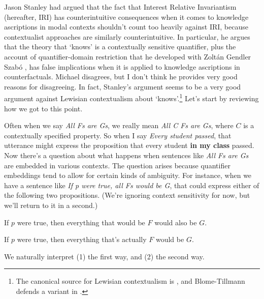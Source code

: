 Jason Stanley had argued that the fact that Interest Relative Invariantism (hereafter, IRI) has counterintuitive consequences when it comes to knowledge ascriptions in modal contexts shouldn't count too heavily against IRI, because contextualist approaches are similarly counterintuitive. In particular, he argues that the theory that `knows' is a contextually sensitive quantifier, plus the account of quantifier-domain restriction that he developed with Zolt\'{a}n Gendler Szab\'{o} \citep{Stanley2000-STAOQD}, has false implications when it is applied to knowledge ascriptions in counterfactuals. Michael \cite{MBT2009} disagrees, but I don't think he provides very good reasons for disagreeing. In fact, Stanley's argument seems to be a very good argument against Lewisian contextualism about `knows'.\footnote{The canonical source for Lewisian contextualism is \cite{Lewis1996b}, and Blome-Tillmann defends a variant in \cite{MBT2009a}.} Let's start by reviewing how we got to this point.

Often when we say \textit{All Fs are Gs}, we really mean \textit{All C Fs are Gs}, where \(C\) is a contextually specified property. So when I say \textit{Every student passed}, that utterance might express the proposition that every student \textbf{in my class} passed. Now there's a question about what happens when sentences like \textit{All Fs are Gs} are embedded in various contexts. The question arises because quantifier embeddings tend to allow for certain kinds of ambiguity. For instance, when we have a sentence like \textit{If p were true, all Fs would be G}, that could express either of the following two propositions. (We're ignoring context sensitivity for now, but we'll return to it in a second.)

\begin{itemize*}
\item If \(p\) were true, then everything that would be \(F\) would also be \(G\).
\item If \(p\) were true, then everything that's actually \(F\) would be \(G\).
\end{itemize*}

\noindent We naturally interpret (1) the first way, and (2) the second way.



